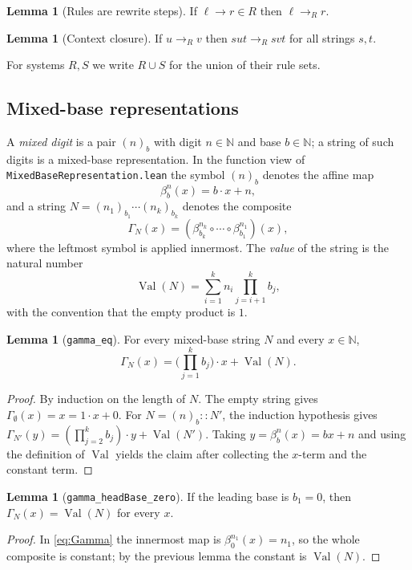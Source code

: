 \documentclass[11pt,a4paper]{article}
\theoremstyle{definition}
\newtheorem{lemma}[definition]{Lemma}
\newcommand{\Nat}{\mathbb{N}}
\newcommand{\val}{\operatorname{Val}}
\begin{document}
\begin{lemma}[Rules are rewrite steps]
  If $\ell\to r\in R$ then $\ell\to_R r$.
\end{lemma}

\begin{lemma}[Context closure]
  If $u\to_R v$ then $sut\to_R svt$ for all strings $s,t$.
\end{lemma}

For systems $R,S$ we write $R\cup S$ for the union of their rule sets.

\subsection{Mixed-base representations}
\label{subsec:mixed-base}

A \emph{mixed digit} is a pair $(n)_b$ with digit $n\in\Nat$ and base
$b\in\Nat$; a string of such digits is a mixed-base representation.  In
the function view of \texttt{MixedBaseRepresentation.lean} the symbol
$(n)_b$ denotes the affine map
\[
  \beta_b^n(x)=b\cdot x+n,
\]
and a string $N=(n_1)_{b_1}\cdots(n_k)_{b_k}$ denotes the composite
\begin{equation}
  \label{eq:Gamma}
  \Gamma_N(x)
  =
  (\beta_{b_k}^{n_k}\circ\cdots\circ\beta_{b_1}^{n_1})(x),
\end{equation}
where the leftmost symbol is applied innermost.  The \emph{value} of the
string is the natural number
\begin{equation}
  \label{eq:val-mixed}
  \val(N)=\sum_{i=1}^{k} n_i\prod_{j=i+1}^{k} b_j,
\end{equation}
with the convention that the empty product is $1$.

\begin{lemma}[\texttt{gamma\_eq}]
  For every mixed-base string $N$ and every $x\in\Nat$,
  \[
    \Gamma_N(x)=\bigl(\prod_{j=1}^{k} b_j\bigr)\cdot x+\val(N).
  \]
\end{lemma}
\begin{proof}
  By induction on the length of $N$.  The empty string gives
  $\Gamma_{\emptyset}(x)=x=1\cdot x+0$.  For $N=(n)_b::N'$, the
  induction hypothesis gives
  $\Gamma_{N'}(y)=(\prod_{j=2}^{k} b_j)\cdot y+\val(N')$.  Taking
  $y=\beta_b^n(x)=bx+n$ and using the definition of $\val$ yields the
  claim after collecting the $x$-term and the constant term.
\end{proof}

\begin{lemma}[\texttt{gamma\_headBase\_zero}]
  If the leading base is $b_1=0$, then $\Gamma_N(x)=\val(N)$ for every
  $x$.
\end{lemma}
\begin{proof}
  In \eqref{eq:Gamma} the innermost map is $\beta_0^{n_1}(x)=n_1$, so
  the whole composite is constant; by the previous lemma the constant is
  $\val(N)$.
\end{proof}
\end{document}

